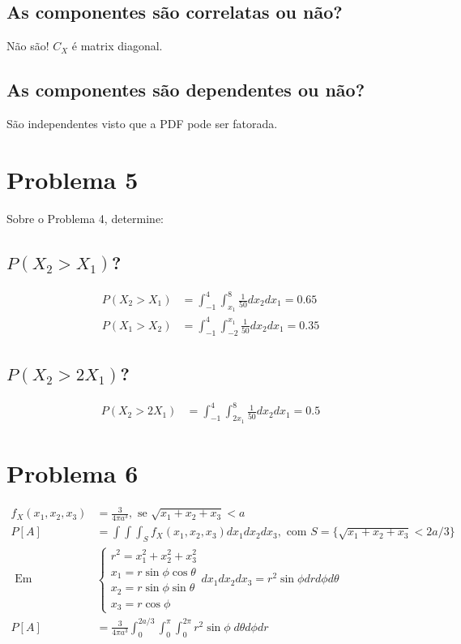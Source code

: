 \documentclass{article}
\begin{document}
\subsection{As componentes são correlatas ou não?}
Não são! $C_X$ é matrix diagonal.

\subsection{As componentes são dependentes ou não?}
São independentes visto que a PDF pode ser fatorada.

\section{Problema 5}
Sobre o Problema 4, determine:

\subsection{$P(X_2 > X_1)$?}
\begin{align*}
    P(X_2 > X_1) &= \int_{-1}^4 \int_{x_1}^8 \frac{1}{50} dx_2 dx_1 = 0.65  \\
    P(X_1 > X_2) &= \int_{-1}^4 \int_{-2}^{x_1} \frac{1}{50} dx_2 dx_1 = 0.35
\end{align*}

\subsection{$P(X_2 > 2X_1)$?}
\begin{align*}
    P(X_2 > 2X_1) &= \int_{-1}^4 \int_{2x_1}^8 \frac{1}{50} dx_2 dx_1 = 0.5
\end{align*}

\section{Problema 6}
\begin{align*}
    f_X(x_1,x_2,x_3) &= \frac{3}{4\pi a^3}, \text{ se } \sqrt{x_1+x_2+x_3} < a \\
    P[A] &= \int\int\int_S f_X(x_1,x_2,x_3) dx_1 dx_2 dx_3, \text{ com } S = \{\sqrt{x_1+x_2+x_3} < 2a/3\} \\
    \text{ Em coordenadas esféricas}&
    \begin{cases}
        r^2 = x_1^2 + x_2^2 + x_3^2 \\
        x_1 = r \sin\phi \cos\theta \\
        x_2 = r \sin\phi \sin\theta \\
        x_3 = r \cos\phi
    \end{cases} dx_1 dx_2 dx_3 = r^2 \sin\phi dr d\phi d\theta \\
    P[A] &= \frac{3}{4\pi a^3} \int_{0}^{2a/3} \int_{0}^{\pi} \int_{0}^{2\pi} r^2 \sin\phi \; d\theta d\phi dr
\end{align*}
\end{document}
